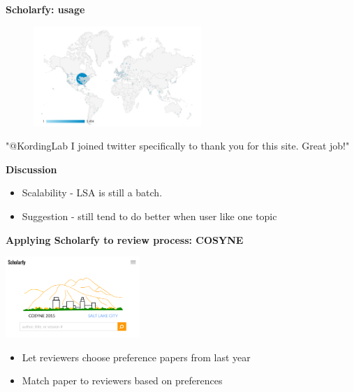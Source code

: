 \begin{frame}{\textbf{Scholarfy: usage}}

\begin{figure}
\includegraphics[width=2.5in]{images/scholarfy_map}\\
\end{figure}

\begin{center}
"@KordingLab I joined twitter specifically to thank you for this site. Great job!"
\end{center}

\end{frame}


\begin{frame}{\textbf{Discussion}}

\begin{itemize}
\item Scalability - LSA is still a batch.
\item Suggestion - still tend to do better when user like one topic
\end{itemize}

\end{frame}


\begin{frame}{\textbf{Applying Scholarfy to review process: COSYNE}}

\begin{center}
\href{http://cosyne.scienceofscience.org/}{\includegraphics[width=2.0in]{images/cosyne}}
\end{center}

\begin{itemize}
\item Let reviewers choose preference papers from last year
\item Match paper to reviewers based on preferences
\end{itemize}

\end{frame}



